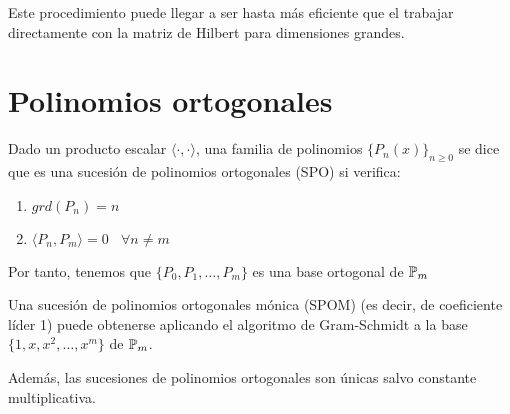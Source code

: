\noindent
Este procedimiento puede llegar a ser hasta más eficiente que el trabajar directamente con la matriz de Hilbert para
dimensiones grandes.

\section{Polinomios ortogonales}
\begin{definicion}
    Dado un producto escalar $\langle \cdot,\cdot \rangle$, una familia de polinomios $\{P_n(x)\}_{n\geq 0}$ se dice que es
    una sucesión de polinomios ortogonales (SPO) si verifica:
    \begin{enumerate}
        \item $grd(P_n) = n$
        \item $\langle P_n, P_m \rangle = 0~~~~\forall n \neq m$
    \end{enumerate}
    \noindent
    Por tanto, tenemos que $\{P_0, P_1, \ldots, P_m\}$ es una base ortogonal de $\mathbb{P}_m$
\end{definicion}

\noindent
Una sucesión de polinomios ortogonales mónica (SPOM) (es decir, de coeficiente líder 1) puede obtenerse aplicando el algoritmo de
Gram-Schmidt a la base $\{1, x, x^2, \ldots, x^m\}$ de $\mathbb{P}_m$.

\noindent
Además, las sucesiones de polinomios ortogonales son únicas salvo constante multiplicativa.

